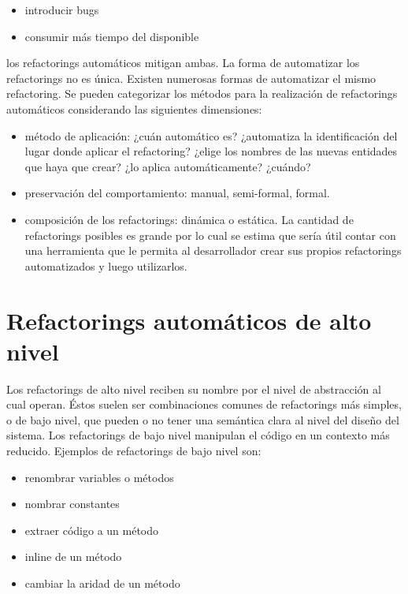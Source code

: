 \begin{itemize}
    \item introducir bugs
    \item consumir más tiempo del disponible
\end{itemize}

los refactorings automáticos mitigan ambas. La forma de automatizar los refactorings no es única. Existen
numerosas formas de automatizar el mismo refactoring. Se pueden categorizar los métodos para la realización
de refactorings automáticos considerando las siguientes dimensiones:

\begin{itemize}
    \item método de aplicación: ¿cuán automático es? ¿automatiza la identificación del lugar donde
    aplicar el refactoring? ¿elige los nombres de las nuevas entidades que haya que crear? ¿lo
    aplica automáticamente? ¿cuándo?
    \item preservación del comportamiento: manual, semi-formal, formal.
    \item composición de los refactorings: dinámica o estática. La cantidad de refactorings posibles
es grande por lo cual se estima que sería útil contar con una herramienta que le permita al
desarrollador crear sus propios refactorings automatizados y luego utilizarlos.
\end{itemize}



\section{Refactorings automáticos de alto nivel}
Los refactorings de alto nivel reciben su nombre por el nivel de abstracción al cual operan. Éstos
suelen ser combinaciones comunes de refactorings más simples, o de bajo nivel, que pueden o no tener
una semántica clara al nivel del diseño del sistema. Los refactorings de bajo nivel manipulan el código en
un contexto más reducido. Ejemplos de refactorings de bajo nivel son:

\begin{itemize}
    \item renombrar variables o métodos
    \item nombrar constantes
    \item extraer código a un método
    \item inline de un método
    \item cambiar la aridad de un método
\end{itemize}

